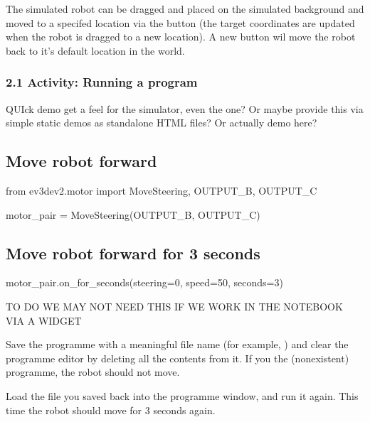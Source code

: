 \documentclass[letterpaper,10pt,english]{sphinxmanual}
\begin{document}
The simulated robot can be dragged and placed on the simulated background and moved to a specifed location via the  button (the target co\sphinxhyphen{}ordinates are updated when the robot is dragged to a new location). A new  button wil move the robot back to it’s default location in the world.



\subsubsection{2.1 Activity: Running a program}
\label{\detokenize{content/00_SOFTWARE_GUIDE/Section_00_02-nb3devsim:2.1-Activity:-Running-a-program}}
QUIck demo \sphinxhyphen{} get a feel for the simulator, even the  one? Or maybe provide this via simple static demos as standalone HTML files? Or actually demo  here?




\subsection{Move robot forward}
\label{\detokenize{content/00_SOFTWARE_GUIDE/Section_00_02-nb3devsim:Move-robot-forward}}
from ev3dev2.motor import MoveSteering, OUTPUT\_B, OUTPUT\_C

motor\_pair = MoveSteering(OUTPUT\_B, OUTPUT\_C)


\subsection{Move robot forward for 3 seconds}
\label{\detokenize{content/00_SOFTWARE_GUIDE/Section_00_02-nb3devsim:Move-robot-forward-for-3-seconds}}
motor\_pair.on\_for\_seconds(steering=0, speed=50, seconds=3)



TO DO \sphinxhyphen{} WE MAY NOT NEED THIS IF WE WORK IN THE NOTEBOOK VIA A WIDGET

Save the programme with a meaningful file name (for example, ) and clear the programme editor by deleting all the contents from it. If you  the (non\sphinxhyphen{}existent) programme, the robot should not move.

Load the file you saved back into the programme window, and run it again. This time the robot should move for 3 seconds again.
\end{document}
